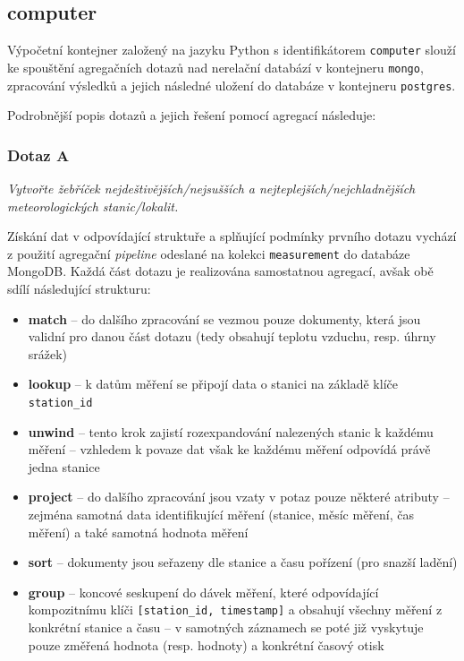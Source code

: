 \documentclass[10pt,a4paper,titlepage]{extarticle}
\begin{document}
    \subsection{computer}

    Výpočetní kontejner založený na jazyku Python s identifikátorem \texttt{computer} slouží ke spouštění agregačních
    dotazů nad nerelační databází v kontejneru \texttt{mongo}, zpracování výsledků a jejich následné uložení do databáze
    v kontejneru \texttt{postgres}.

    Podrobnější popis dotazů a jejich řešení pomocí agregací následuje:

    \subsubsection{Dotaz A}
    \emph{Vytvořte žebříček nejdeštivějších/nejsušších a nejteplejších/nejchladnějších meteorologických stanic/lokalit.}

    Získání dat v odpovídající struktuře a splňující podmínky prvního dotazu vychází z použití agregační \emph{pipeline}
    odeslané na kolekci \texttt{measurement} do databáze MongoDB. Každá část dotazu je realizována samostatnou
    agregací, avšak obě sdílí následující strukturu:
    \begin{itemize}
        \item \textbf{{\textdollar}match} -- do dalšího zpracování se vezmou pouze dokumenty, která jsou validní pro
        danou část dotazu (tedy obsahují teplotu vzduchu, resp. úhrny srážek)
        \item \textbf{{\textdollar}lookup} -- k datům měření se připojí data o stanici na základě klíče \texttt{station\_id}
        \item \textbf{{\textdollar}unwind} -- tento krok zajistí rozexpandování nalezených stanic k každému měření --
        vzhledem k povaze dat však ke každému měření odpovídá právě jedna stanice
        \item \textbf{{\textdollar}project} -- do dalšího zpracování jsou vzaty v potaz pouze některé
        atributy -- zejména samotná data identifikující měření (stanice, měsíc měření, čas měření) a také samotná
        hodnota měření
        \item \textbf{{\textdollar}sort} -- dokumenty jsou seřazeny dle stanice a času pořízení (pro snazší ladění)
        \item \textbf{{\textdollar}group} -- koncové seskupení do dávek měření, které odpovídající kompozitnímu klíči
        \texttt{[station\_id, timestamp]} a obsahují všechny měření z konkrétní stanice a času -- v
        samotných záznamech se poté již vyskytuje pouze změřená hodnota (resp. hodnoty) a konkrétní časový otisk
    \end{itemize}
    
\end{document}
